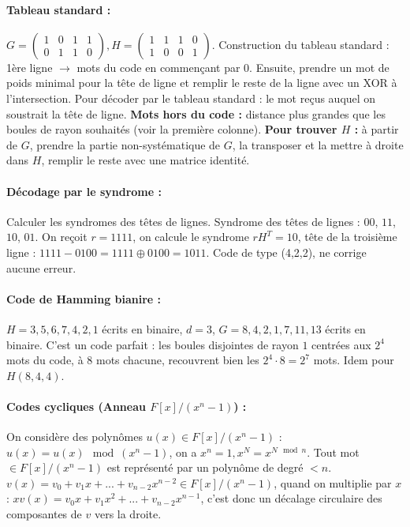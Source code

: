 \documentclass[11pt,a4paper]{report}
\begin{document}
\paragraph*{Tableau standard :} $G=\begin{pmatrix}1&0&1&1\\0&1&1&0\end{pmatrix}, H=\begin{pmatrix}1&1&1&0\\1&0&0&1\end{pmatrix}$. Construction du tableau standard : 1ère ligne $\rightarrow$ mots du code en commençant par $0$. Ensuite, prendre un mot de poids minimal pour la tête de ligne et remplir le reste de la ligne avec un XOR à l'intersection. Pour décoder par le tableau standard : le mot reçus auquel on soustrait la tête de ligne. \textbf{Mots hors du code :} distance plus grandes que les boules de rayon souhaités (voir la première colonne). \textbf{Pour trouver $H$ :} à partir de $G$, prendre la partie non-systématique de $G$, la transposer et la mettre à droite dans $H$, remplir le reste avec une matrice identité. 

\paragraph*{Décodage par le syndrome :} Calculer les syndromes des têtes de lignes. Syndrome des têtes de lignes : $00$, $11$, $10$, $01$. On reçoit $r=1111$, on calcule le syndrome $rH^T=10$, tête de la troisième ligne : $1111 - 0100 = 1111 \oplus 0100 = 1011$. Code de type (4,2,2), ne corrige aucune erreur.

\paragraph*{Code de Hamming bianire :} $H=3,5,6,7,4,2,1$ écrits en binaire, $d=3$, $G=8,4,2,1,7,11,13$ écrits en binaire. C'est un code parfait : les boules disjointes de rayon $1$ centrées aux $2^4$ mots du code, à $8$ mots chacune, recouvrent bien les $2^4\cdot 8=2^7$ mots. Idem pour $H(8,4,4)$.

\paragraph*{Codes cycliques (Anneau $F[x]/(x^n-1)$) :} On considère des polynômes $u(x)\in F[x]/(x^n-1)$ : $u(x)=u(x)\mod(x^n-1)$, on a $x^n = 1, x^N=x^{N\mod n}$. Tout mot $\in F[x]/(x^n-1)$ est représenté par un polynôme de degré $<n$. $v(x)=v_0+v_1x+...+v_{n-2}x^{n-2}\in F[x]/(x^n-1)$, quand on multiplie par $x$ : $xv(x) = v_0x+v_1x^2+...+v_{n-2}x^{n-1}$, c'est donc un décalage circulaire des composantes de $v$ vers la droite.
\end{document}
